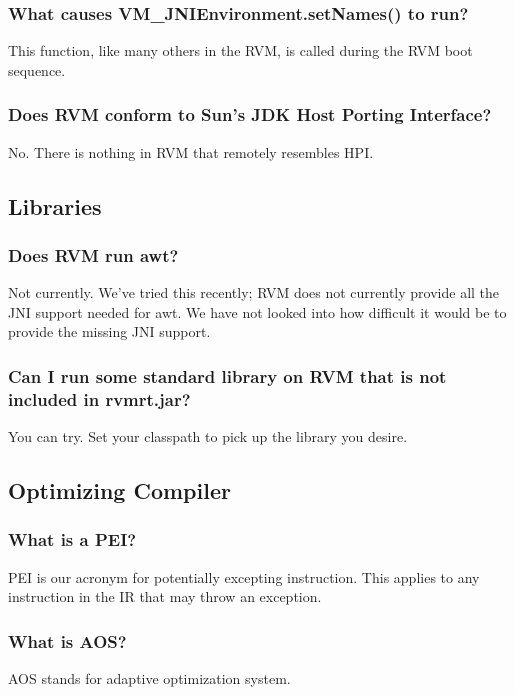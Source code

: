 \subsubsection{What causes VM\_JNIEnvironment.setNames() to run?}
This function, like many others in the RVM, is called during the RVM boot
sequence.

\subsubsection{Does RVM conform to Sun's JDK Host Porting Interface?}

No. There is nothing in RVM that remotely resembles HPI.

\JavaTMFooter

\AIXTMFooter

\PowerPCTMFooter

\subsection{Libraries}

\subsubsection{Does RVM run awt?}

Not currently.  We've tried this recently; RVM does not currently provide
all the JNI support needed for awt.  We have not looked into how difficult
it would be to provide the missing JNI support.

\subsubsection{Can I run some standard library on RVM that is not included
in rvmrt.jar?}

You can try.  Set your classpath to pick up the library you desire.

\subsection{Optimizing Compiler}

\subsubsection{What is a PEI?}
PEI is our acronym for potentially excepting instruction.  This applies to
any instruction in the IR that may throw an exception.

\subsubsection{What is AOS?}
AOS stands for adaptive optimization system.

